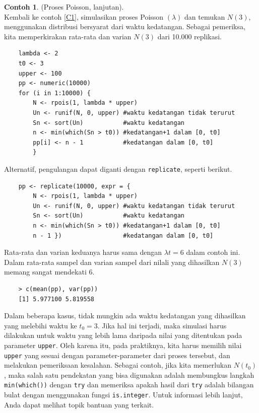 \documentclass[a4paper,12pt]{article}
\theoremstyle{definition}
\newtheorem{example}{Contoh}[section]
\begin{document}
\begin{example} (Proses Poisson, lanjutan). \label{C2}\\
Kembali ke contoh \ref{C1}, simulasikan proses Poisson $(\lambda)$ dan temukan $N(3)$, menggunakan distribusi bersyarat dari waktu kedatangan. Sebagai pemeriksa, kita memperkirakan rata-rata dan varian $N(3)$ dari 10.000 replikasi.

    \begin{lstlisting}
    lambda <- 2
    t0 <- 3
    upper <- 100
    pp <- numeric(10000)
    for (i in 1:10000) {
        N <- rpois(1, lambda * upper)
        Un <- runif(N, 0, upper) #waktu kedatangan tidak terurut
        Sn <- sort(Un)           #waktu kedatangan
        n <- min(which(Sn > t0)) #kedatangan+1 dalam [0, t0]
        pp[i] <- n - 1           #kedatangan dalam [0, t0]
        }
    \end{lstlisting}

Alternatif, pengulangan dapat diganti dengan \texttt{replicate}, seperti berikut.

    \begin{lstlisting}
    pp <- replicate(10000, expr = {
        N <- rpois(1, lambda * upper)
        Un <- runif(N, 0, upper) #waktu kedatangan tidak terurut
        Sn <- sort(Un)           #waktu kedatangan
        n <- min(which(Sn > t0)) #kedatangan+1 dalam [0, t0]
        n - 1 })                 #kedatangan dalam [0, t0]
    \end{lstlisting}

Rata-rata dan varian keduanya harus sama dengan $\lambda t = 6$ dalam contoh ini. Dalam rata-rata sampel dan varian sampel dari nilali yang dihasilkan $N(3)$ memang sangat mendekati 6.

    \begin{lstlisting}
    > c(mean(pp), var(pp))
    [1] 5.977100 5.819558
    \end{lstlisting}
    
Dalam beberapa kasus, tidak mungkin ada waktu kedatangan yang dihasilkan yang melebihi waktu ke $t_0 = 3$. Jika hal ini terjadi, maka simulasi harus dilakukan untuk waktu yang lebih lama daripada nilai yang ditentukan pada parameter \texttt{upper}. Oleh karena itu, pada praktiknya, kita harus memilih nilai \texttt{upper} yang sesuai dengan parameter-parameter dari proses tersebut, dan melakukan pemeriksaan kesalahan. Sebagai contoh, jika kita memerlukan $N(t_0)$, maka salah satu pendekatan yang bisa digunakan adalah membungkus langkah \texttt{min(which())} dengan \texttt{try} dan memeriksa apakah hasil dari \texttt{try} adalah bilangan bulat dengan menggunakan fungsi \texttt{is.integer}. Untuk informasi lebih lanjut, Anda dapat melihat topik bantuan yang terkait.


\end{example}
\end{document}
